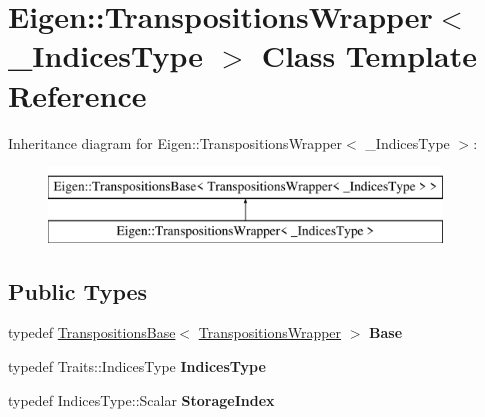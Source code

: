 \hypertarget{class_eigen_1_1_transpositions_wrapper}{}\section{Eigen\+::Transpositions\+Wrapper$<$ \+\_\+\+Indices\+Type $>$ Class Template Reference}
\label{class_eigen_1_1_transpositions_wrapper}
Inheritance diagram for Eigen\+::Transpositions\+Wrapper$<$ \+\_\+\+Indices\+Type $>$\+:\begin{figure}[H]
\begin{center}
\leavevmode
\includegraphics[height=2.000000cm]{class_eigen_1_1_transpositions_wrapper}
\end{center}
\end{figure}
\subsection*{Public Types}
\begin{DoxyCompactItemize}
\item 
\mbox{\label{class_eigen_1_1_transpositions_wrapper_a94ed84038f4e22d54262b354f112fa76}} 
typedef \mbox{\hyperlink{class_eigen_1_1_transpositions_base}{Transpositions\+Base}}$<$ \mbox{\hyperlink{class_eigen_1_1_transpositions_wrapper}{Transpositions\+Wrapper}} $>$ {\bfseries Base}
\item 
\mbox{\label{class_eigen_1_1_transpositions_wrapper_ad928b75abe38ccb534d78276db4134db}} 
typedef Traits\+::\+Indices\+Type {\bfseries Indices\+Type}
\item 
\mbox{\label{class_eigen_1_1_transpositions_wrapper_ac57efa0257d22082939d17fd0d2aaf95}} 
typedef Indices\+Type\+::\+Scalar {\bfseries Storage\+Index}
\end{DoxyCompactItemize}
